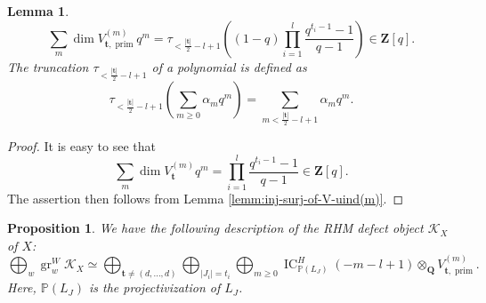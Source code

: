 \documentclass[10pt,a4paper]{amsart}
\newtheorem{lemm}{Lemma}
\newtheorem{prop}{Proposition}
\DeclareMathOperator{\IC}{IC}
\newcommand{\PP}{\mathbb{P}}
\newcommand{\QQ}{\mathbf{Q}}
\newcommand{\ZZ}{\mathbf{Z}}
\newcommand{\bft}{\mathbf{t}}
\newcommand{\cK}{\mathcal{K}}
\DeclareMathOperator{\gr}{gr}
\DeclareMathOperator{\prim}{prim}
\newcommand{\uind}[1]{^{(#1)}}
\begin{document}
     \begin{lemm} \label{lemm:dimension-of-Vt-prim}
         $$ \sum_{m} \dim V_{\bft, \prim}\uind{m} q^m = \tau_{<\frac{|\bft|}{2}-l+1} \left( (1-q) \prod_{i=1}^{l} \frac{q^{t_{i}-1}-1}{q-1} \right) \in \ZZ[q].$$
         The truncation $\tau_{<\frac{|\bft|}{2}-l+1}$ of a polynomial is defined as
         $$ \tau_{<\frac{|\bft|}{2}-l+1} \left( \sum_{m \geq 0} \alpha_{m} q^{m} \right) = \sum_{m < \frac{|\bft|}{2}-l+1} \alpha_{m}q^{m}.$$
     \end{lemm}
     \begin{proof}
         It is easy to see that
         $$ \sum_{m} \dim V_{\bft}\uind{m} q^{m} = \prod_{i=1}^{l} \frac{q^{t_{i}-1}-1}{q-1} \in \ZZ[q].$$
         The assertion then follows from Lemma \ref{lemm:inj-surj-of-V-uind(m)}.
     \end{proof}

    \begin{prop} \label{prop:RHM-defect-object-X-graded}
        We have the following description of the RHM defect object $\cK_{X}$ of $X$:
        $$ \bigoplus_{w} \gr_{w}^{W} \cK_{X} \simeq \bigoplus_{\bft \neq (d, \ldots, d)} \bigoplus_{|J_{i}| = t_{i}} \bigoplus_{m \geq 0} \IC_{\PP(L_{J})}^{H} (-m-l+1) \otimes_{\QQ} V_{\bft, \prim}\uind{m}.$$
        Here, $\PP(L_{J})$ is the projectivization of $L_{J}$.
    \end{prop}
\end{document}
